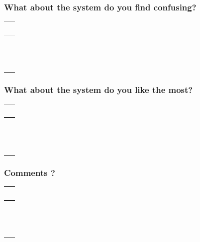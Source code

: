 \documentclass[12pt]{report}
\begin{document}
\subsubsection*{What about the system do you find confusing? }
\begin{tabular}{ p{\linewidth} } \ \\ \hline \ \\ \hline \ \\ \hline \ \\  \hline \end{tabular}

\subsubsection*{What about the system do you like the most? }
\begin{tabular}{ p{\linewidth} } \ \\ \hline \ \\ \hline \ \\ \hline \ \\  \hline \end{tabular}

\subsubsection*{Comments ? }
\begin{tabular}{ p{\linewidth} } \ \\ \hline \ \\ \hline \ \\ \hline \ \\  \hline \end{tabular}
\end{document}

